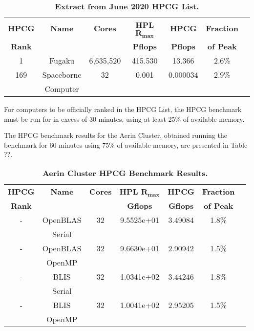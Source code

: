 \begin{table}[H]
\begin{center}
\begin{tabular}{ |c|c|c|c|c|c|c| } 
\hline
\textbf{HPCG} & \textbf{Name} & \textbf{Cores} & \textbf{HPL $\mathbf{R_{max}}$} & \textbf{HPCG}   & \textbf{Fraction} \\
\textbf{Rank} &      &       & \textbf{Pflops}        & \textbf{Pflops} & \textbf{of Peak}  \\
\hline
1 & Fugaku & 6,635,520 & 415.530  & 13.366 & 2.6\% \\
\hline
169 & Spaceborne & 32 & 0.001  & 0.000034 & 2.9\% \\
    & Computer   &    &        &          &       \\
\hline
\end{tabular}
\end{center}
\caption{\label{tab:table-name}\textbf{Extract from June 2020 HPCG List.}}
\end{table}

For computers to be officially ranked in the HPCG List, the HPCG benchmark must be run for in excess of 30 minutes, using at least 25\% of available memory.

The HPCG benchmark results for the Aerin Cluster, obtained running the benchmark for 60 minutes using 75\% of available memory, are presented in Table ??.

\begin{table}[H]
\begin{center}
\begin{tabular}{ |c|c|c|c|c|c|c| } 
\hline
\textbf{HPCG} & \textbf{Name} & \textbf{Cores} & \textbf{HPL $\mathbf{R_{max}}$} & \textbf{HPCG}   & \textbf{Fraction} \\
\textbf{Rank} &      &       & \textbf{Gflops}        & \textbf{Gflops} & \textbf{of Peak}  \\
\hline
- & OpenBLAS & 32 & 9.5525e+01 & 3.49084 & 1.8\% \\
  & Serial   &   &  &  &    \\
\hline
- & OpenBLAS & 32 & 9.6630e+01 & 2.90942 & 1.5\% \\
  & OpenMP   &   &  &  &    \\
\hline
- & BLIS     & 32 & 1.0341e+02 & 3.44246 & 1.8\% \\
  & Serial   &   &  &  &    \\
\hline
- & BLIS     & 32 & 1.0041e+02 & 2.95205 & 1.5\% \\
  & OpenMP   &   &  &  &    \\
\hline
\end{tabular}
\end{center}
\caption{\label{tab:table-name}\textbf{Aerin Cluster HPCG Benchmark Results.}}
\end{table}


